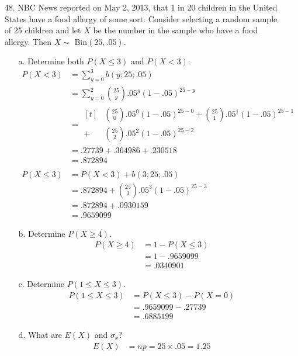 \documentclass[letterpaper,12pt]{article}
\newcommand{\bp}[3]{%
  \binom{#2}{#1}#3^#1(1 - #3)^{#2 - #1}%
}
\begin{document}
\begin{enumerate}
\begin{enumerate}
    \end{enumerate}
  \item[48.]
    NBC News reported on May 2, 2013, that 1 in 20 children in the United States have a food allergy of some sort. Consider selecting a random sample of 25 children and let $X$ be the number in the sample who have a food allergy. Then $X \sim$ Bin$(25, .05)$.
    \begin{enumerate}
      \item[a.]
        Determine both $P(X \le 3)$ and $P(X < 3)$.
        \begin{align*}
          P(X < 3) &= \sum_{y = 0}^3 b(y; 25; .05) \\
          &= \sum_{y = 0}^2 \bp{y}{25}{.05} \\
          &= \begin{aligned}[t]
              &\bp{0}{25}{.05} + \bp{1}{25}{.05} \\
            + &\bp{2}{25}{.05}
          \end{aligned} \\
          &= .27739 + .364986 + .230518 \\
          &= .872894 \\
          \\
          P(X \le 3) &= P(X < 3) + b(3; 25; .05) \\
          &= .872894 + \bp{3}{25}{.05} \\
          &= .872894 + .0930159 \\
          &= .9659099
        \end{align*}
      \item[b.]
        Determine $P(X \ge 4)$.
        \begin{align*}
          P(X \ge 4) &= 1 - P(X \le 3) \\
          &= 1 - .9659099 \\
          &= .0340901
        \end{align*}
      \item[c.]
        Determine $P(1 \le X \le 3)$.
        \begin{align*}
          P(1 \le X \le 3) &= P(X \le 3) - P(X = 0) \\
          &= .9659099 - .27739 \\
          &= .6885199
        \end{align*}
      \item[d.]
        What are $E(X)$ and $\sigma_x$?
        \begin{align*}
          E(X) &= np = 25 \times .05 = 1.25 \\

\end{align*}
\end{enumerate}
\end{enumerate}
\end{document}
